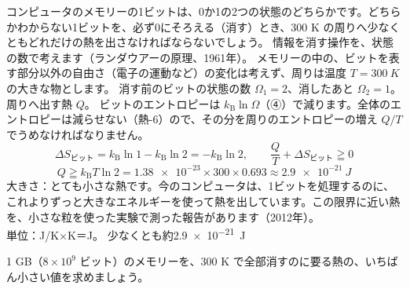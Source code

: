\label{ph:熱-15:ex11}
\begin{phreidai}[1ビットを消すのに要る熱]
コンピュータのメモリーの1ビットは、0か1の2つの状態のどちらかです。どちらかわからない1ビットを、必ず0にそろえる（消す）とき、300 K の周りへ少なくともどれだけの熱を出さなければならないでしょう。
\phbamen
情報を消す操作を、状態の数で考えます（ランダウアーの原理、1961年）。
\phmushi
メモリーの中の、ビットを表す部分以外の自由さ（電子の運動など）の変化は考えず、周りは温度 $T=\qty{300}{K}$ の大きな物とします。
\phzu
消す前のビットの状態の数 $\Omega_1=2$、消したあと $\Omega_2=1$。周りへ出す熱 $Q$。
\phriyu
ビットのエントロピーは $k_{\mathrm B}\ln\Omega$（④）で減ります。全体のエントロピーは減らせない（熱-6）ので、その分を周りのエントロピーの増え $Q/T$ でうめなければなりません。
\phtateru
\[\Delta S_{\text{ビット}}=k_{\mathrm B}\ln1-k_{\mathrm B}\ln2=-k_{\mathrm B}\ln2,\qquad \frac{Q}{T}+\Delta S_{\text{ビット}}\geqq0\]
\phtoku
\[Q\geqq k_{\mathrm B}T\ln2=\num{1.38e-23}\times300\times0.693\approx\qty{2.9e-21}{J}\]
\phtashikame
大きさ：とても小さな熱です。今のコンピュータは、1ビットを処理するのに、これよりずっと大きなエネルギーを使って熱を出しています。この限界に近い熱を、小さな粒を使った実験で測った報告があります（2012年）。\\
単位：J/K×K＝J。
\kotae 少なくとも約\qty{2.9e-21}{J}
\end{phreidai}
\begin{jibun}
1 GB（$8\times10^9$ ビット）のメモリーを、300 K で全部消すのに要る熱の、いちばん小さい値を求めましょう。
\end{jibun}

